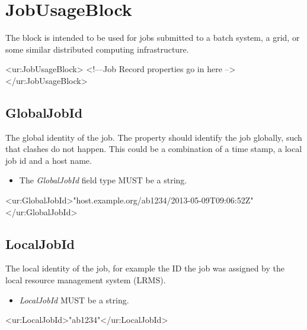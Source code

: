 
\section{JobUsageBlock}

The block is intended to be used for jobs submitted to a batch system, a grid, or some similar distributed computing infrastructure.

\begin{XMLexample}
<ur:JobUsageBlock>
<!—Job Record properties go in here -->
</ur:JobUsageBlock> 
\end{XMLexample}






\subsection{GlobalJobId}

The global identity of the job. The property should identify the job globally, such that clashes do not happen. This could be a combination of a time stamp, a local job id and a host name.

\begin{itemize}
\item The \emph{GlobalJobId} field type MUST be a string.
\end{itemize}

\begin{XMLexample}
<ur:GlobalJobId>"host.example.org/ab1234/2013-05-09T09:06:52Z"</ur:GlobalJobId>
\end{XMLexample}






\subsection{LocalJobId}

The local identity of the job, for example the ID the job was assigned by the local resource management system (LRMS).

\begin{itemize}
\item \emph{LocalJobId} MUST be a string.
\end{itemize}

\begin{XMLexample}
<ur:LocalJobId>"ab1234"</ur:LocalJobId>
\end{XMLexample}



